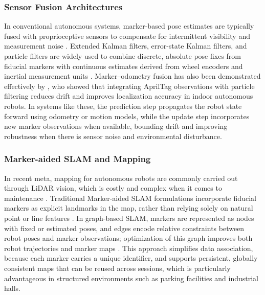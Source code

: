 \subsubsection{Sensor Fusion Architectures}
In conventional autonomous systems, marker-based pose estimates are typically fused with proprioceptive sensors to compensate for intermittent visibility and measurement noise \citep{Kumar2023LocalizationSurveyAV}. Extended Kalman filters, error-state Kalman filters, and particle filters are widely used to combine discrete, absolute pose fixes from fiducial markers with continuous estimates derived from wheel encoders and inertial measurement units \citep{DeLaPuente2025VisionRangeAMCL, Ullah2020FilterLocalizationEvaluation}. Marker–odometry fusion has also been demonstrated effectively by \cite{Alam2023FiducialPFLocalization}, who showed that integrating AprilTag observations with particle filtering reduces drift and improves localization accuracy in indoor autonomous robots. In systems like these, the prediction step propagates the robot state forward using odometry or motion models, while the update step incorporates new marker observations when available, bounding drift and improving robustness when there is sensor noise and environmental disturbance.

\subsubsection{Marker-aided SLAM and Mapping}
In recent meta, mapping for autonomous robots are commonly carried out through LiDAR vision, which is costly and complex when it comes to maintenance \cite{Chen2025MapsAutonomousDrivingSurvey}. Traditional Marker-aided SLAM formulations incorporate fiducial markers as explicit landmarks in the map, rather than relying solely on natural point or line features \cite{Tourani2023MarkerBasedVisualSLAM}. In graph-based SLAM, markers are represented as nodes with fixed or estimated poses, and edges encode relative constraints between robot poses and marker observations; optimization of this graph improves both robot trajectories and marker maps \cite{MunozSalinas2018SPMSLAM}. This approach simplifies data association, because each marker carries a unique identifier, and supports persistent, globally consistent maps that can be reused across sessions, which is particularly advantageous in structured environments such as parking facilities and industrial halls.

